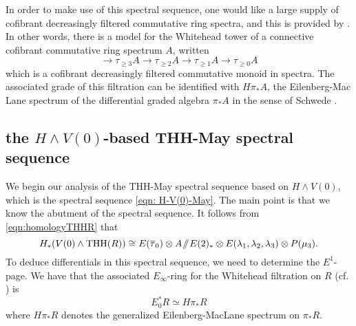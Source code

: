In order to make use of this spectral sequence, one would like a large supply of cofibrant decreasingly filtered commutative ring spectra, and this is provided by \cite[Thm. qx]{THH-May}. In other words, there is a model for the Whitehead tower of a connective cofibrant commutative ring spectrum $A$, written 
\[ \rightarrow  \tau_{\ge 3}A \rightarrow \tau_{\ge 2}A \rightarrow \tau_{\ge 1}A \rightarrow \tau_{\ge 0} A \]
which is a cofibrant decreasingly filtered commutative monoid in spectra. The associated grade of this filtration can be identified with $H\pi_*A$, the Eilenberg-Mac Lane spectrum of the differential graded algebra $\pi_*A$ in the sense of Schwede \cite{qx}. 


\subsection{the $H\wedge V(0)$-based THH-May spectral sequence}

We begin our analysis of the THH-May spectral sequence based on $H\wedge V(0)$, which is the spectral sequence \eqref{eqn: H-V(0)-May}. The main point is that we know the abutment of the spectral sequence. It follows from \eqref{eqn:homologyTHHR} that
\[
H_*(V(0)\wedge \operatorname{THH}(R))\cong E(\overline{\tau}_0)\otimes A\! \sslash \! E(2)_*\otimes E(\lambda_1, \lambda_2, \lambda_3)\otimes P(\mu_3). 
\]
To deduce differentials in this spectral sequence, we need to determine the $E^1$-page. We have that the associated $E_\infty$-ring for the Whitehead filtration on $R$ (cf. \cite{THH-May}) is 
\[
E^*_0R\simeq H\pi_*R
\]
where $H\pi_*R$ denotes the generalized Eilenberg-MacLane spectrum on $\pi_*R$. 

